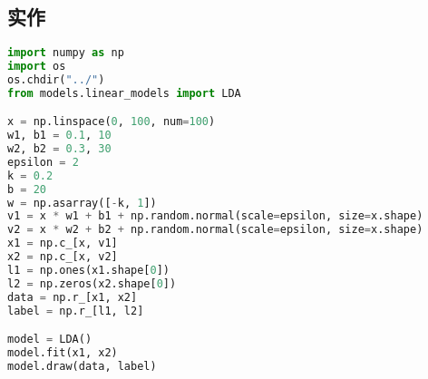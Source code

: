 \documentclass{report}
\begin{document}
\subsection{实作}
\begin{lstlisting}[language={python}]
import numpy as np
import os
os.chdir("../")
from models.linear_models import LDA

x = np.linspace(0, 100, num=100)
w1, b1 = 0.1, 10
w2, b2 = 0.3, 30
epsilon = 2
k = 0.2
b = 20
w = np.asarray([-k, 1])
v1 = x * w1 + b1 + np.random.normal(scale=epsilon, size=x.shape)
v2 = x * w2 + b2 + np.random.normal(scale=epsilon, size=x.shape)
x1 = np.c_[x, v1]
x2 = np.c_[x, v2]
l1 = np.ones(x1.shape[0])
l2 = np.zeros(x2.shape[0])
data = np.r_[x1, x2]
label = np.r_[l1, l2]

model = LDA()
model.fit(x1, x2)
model.draw(data, label)
\end{lstlisting}
\end{document}
